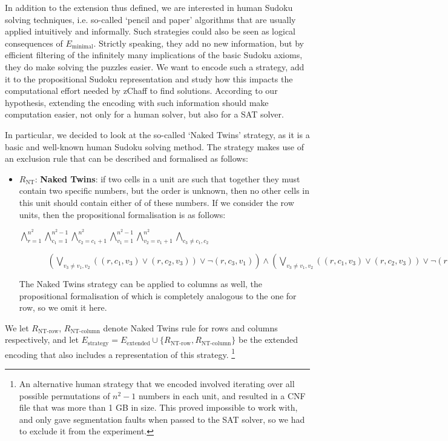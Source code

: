 \documentclass[10pt,a4paper,leqno]{article}
\newcommand{\lp}{\left(}
\newcommand{\rp}{\right)}
\begin{document}
In addition to the extension thus defined, we are interested in human Sudoku solving techniques, i.e. so-called `pencil and paper' algorithms that are usually applied intuitively and informally. Such strategies could also be seen as logical consequences of $E_{\text{minimal}}$. Strictly speaking, they add no new information, but by efficient filtering of the infinitely many implications of the basic Sudoku axioms, they do make solving the puzzles easier. We want to encode such a strategy, add it to the propositional Sudoku representation and study how this impacts the computational effort needed by zChaff to find solutions. According to our hypothesis, extending the encoding with such information should make computation easier, not only for a human solver, but also for a SAT solver.

In particular, we decided to look at the so-called `Naked Twins' strategy, as it is a basic and well-known human Sudoku solving method. The strategy makes use of an exclusion rule that can be described and formalised as follows:

\begin{itemize}

\item $ R_{\text{NT}}$: \textbf{Naked Twins}: if two cells in a unit are such that together they must contain two specific numbers, but the order is unknown, then no other cells in this unit should contain either of of these numbers. If we consider the row units, then the propositional formalisation is as follows: 
 
$\bigwedge_{r=1}^{n^2} \bigwedge_{c_1=1}^{n^2-1}\bigwedge_{c_2=c_1 + 1}^{n^2} \bigwedge_{v_1=1}^{n^2 - 1} \bigwedge_{v_2=v_1 + 1}^{n^2} \bigwedge_{c_3 \neq c_1,c_2} $

$\;\;\;\;\;\;\;\;\;\;\;\; \lp \bigvee_{v_3 \neq v_1,v_2} \lp (r,c_1,v_3) \lor (r,c_2,v_3)\rp \lor \neg (r,c_3,v_1) \rp 
\wedge
\lp \bigvee_{v_3 \neq v_1,v_2} \lp (r,c_1,v_3) \lor (r,c_2,v_3)\rp \lor \neg (r,c_3,v_2) \rp 
$

The Naked Twins strategy can be applied to columns as well, the propositional formalisation of which is completely analogous to the one for row, so we omit it here.

\end{itemize}

We let $R_{\text{NT-row}}$, $R_{\text{NT-column}}$ denote Naked Twins rule for rows and columns respectively, and let $E_{\text{strategy}} = E_{\text{extended}} \cup \{R_{\text{NT-row}}, R_{\text{NT-column}}\}$ be the extended encoding that also includes a representation of this strategy. 
\footnote{
An alternative human strategy that we encoded involved iterating over all possible permutations of $n^2 - 1$ numbers in each unit, and resulted in a CNF file that was more than 1 GB in size. This proved impossible to work with, and only gave segmentation faults when passed to the SAT solver, so we had to exclude it from the experiment.}
\end{document}

